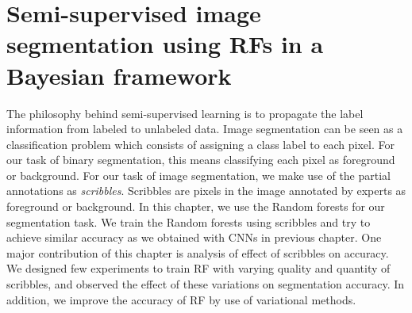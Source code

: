 %
\newpage
\chapter{Semi-supervised image segmentation using RFs in a Bayesian framework }
The philosophy behind semi-supervised learning is to propagate the label information from labeled to unlabeled data. Image segmentation can be seen as a classification problem which consists of assigning a class label to each pixel. For our task of binary segmentation, this means classifying each pixel as foreground or background. For our task of image segmentation, we make use of the partial annotations as \textit{scribbles}. Scribbles are pixels in the image annotated by experts as foreground or background. In this chapter, we use the Random forests for our segmentation task. We train the Random forests using scribbles and try to achieve similar accuracy as we obtained with CNNs in previous chapter. One major contribution of this chapter is analysis of effect of scribbles on accuracy. We designed few experiments to train RF with varying quality and quantity of scribbles, and observed the effect of these variations on segmentation accuracy. In addition, we improve the accuracy of RF by use of variational methods.


